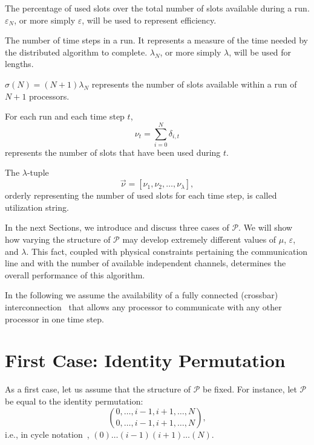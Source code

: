 \documentclass{elsart}
\begin{document}
\begin{defn}[efficiency]
The percentage of used slots over the total number of slots 
available during a run. $\varepsilon_N$, or more simply $\varepsilon$, will
be used to represent efficiency.
\end{defn}

\begin{defn}[length]
The number of time steps in a run. It represents a measure
of the time needed by the distributed algorithm to complete.
$\lambda_N$, or more simply $\lambda$, will be used for lengths.
\end{defn}

\begin{defn}
$\sigma(N) = (N+1)\lambda_N$ represents the number of slots 
available within a run of $N+1$ processors.\label{sigma}
\end{defn}

\begin{defn}
\label{nut}
For each run and each time step $t$,
\[ \nu_t = \sum_{i=0}^N \delta_{i,t} \]
represents the number of slots that have been used during $t$.
\end{defn}

\begin{defn}
\label{us}
The $\lambda$-tuple
\[ \vec{\nu} = [ \nu_1, \nu_2, \dots, \nu_\lambda ], \]
orderly representing the number of used slots for
each time step, is called utilization string.
\end{defn}

In the next Sections, we introduce and discuss three cases
of $\mathcal P$. We will show how varying the structure of $\mathcal P$
may develop extremely different values of $\mu$, $\varepsilon$, and $\lambda$.
This fact, coupled with physical constraints pertaining the communication line
and with the number of available independent channels,
determines the overall performance of this algorithm.

In the following we assume the availability of
a fully connected (crossbar) interconnection~\cite{PaHe96}
that allows any processor to communicate with any other processor
in one time step.

\section{First Case: Identity Permutation}\label{zerocase}
As a first case, let us assume that the structure of $\mathcal P$ 
be fixed. For instance,
let $\mathcal P$ be equal to the identity permutation:
\begin{equation}\label{zeroperm}
\binom{0,\dots,i-1,i+1,\dots,N}{0,\dots,i-1,i+1,\dots,N},
\end{equation}
i.e., in cycle notation~\cite{Knu73a},
\(
(0)\dots(i-1)(i+1)\dots(N).
\)
\end{document}
